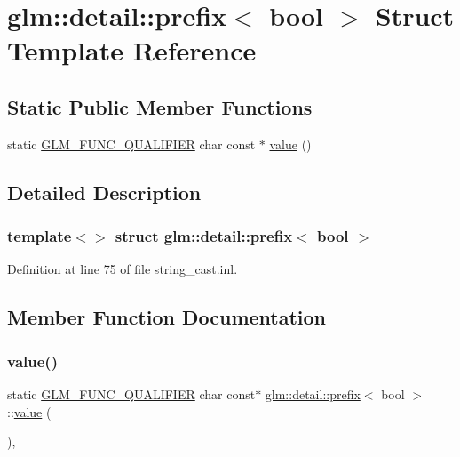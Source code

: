 \hypertarget{structglm_1_1detail_1_1prefix_3_01bool_01_4}{}\section{glm\+::detail\+::prefix$<$ bool $>$ Struct Template Reference}
\label{structglm_1_1detail_1_1prefix_3_01bool_01_4}
\subsection*{Static Public Member Functions}
\begin{DoxyCompactItemize}
\item 
static \mbox{\hyperlink{setup_8hpp_a33fdea6f91c5f834105f7415e2a64407}{G\+L\+M\+\_\+\+F\+U\+N\+C\+\_\+\+Q\+U\+A\+L\+I\+F\+I\+ER}} char const  $\ast$ \mbox{\hyperlink{structglm_1_1detail_1_1prefix_3_01bool_01_4_ab6d6392aa906c684f1abdda98830adad}{value}} ()
\end{DoxyCompactItemize}


\subsection{Detailed Description}
\subsubsection*{template$<$$>$\newline
struct glm\+::detail\+::prefix$<$ bool $>$}



Definition at line 75 of file string\+\_\+cast.\+inl.



\subsection{Member Function Documentation}
\mbox{\label{structglm_1_1detail_1_1prefix_3_01bool_01_4_ab6d6392aa906c684f1abdda98830adad}} 
\subsubsection{\texorpdfstring{value()}{value()}}
{\footnotesize\ttfamily static \mbox{\hyperlink{setup_8hpp_a33fdea6f91c5f834105f7415e2a64407}{G\+L\+M\+\_\+\+F\+U\+N\+C\+\_\+\+Q\+U\+A\+L\+I\+F\+I\+ER}} char const$\ast$ \mbox{\hyperlink{structglm_1_1detail_1_1prefix}{glm\+::detail\+::prefix}}$<$ bool $>$\+::\mbox{\hyperlink{glad_8h_a03aff08f73d7fde3d1a08e0abd8e84fa}{value}} (\begin{DoxyParamCaption}{ }\end{DoxyParamCaption})\hspace{0.3cm}{\ttfamily [inline]}, {\ttfamily [static]}}



